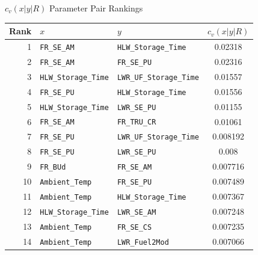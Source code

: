 \documentclass[pdf, autumn, slideColor, nocolorBG]{prosper}
\begin{document}
\begin{slide}{$c_v(x|y|R)$ Parameter Pair Rankings}
\begin{center}
\tiny
\begin{tabular}{|r|l|l|c|}
\hline
\textbf{Rank}&\textbf{$x$}&\textbf{$y$}&\textbf{$c_v(x|y|R)$}\\
\hline
1&\texttt{FR\_SE\_AM}&\texttt{HLW\_Storage\_Time}&0.02318\\
\hline
2&\texttt{FR\_SE\_AM}&\texttt{FR\_SE\_PU}&0.02316\\
\hline
3&\texttt{HLW\_Storage\_Time}&\texttt{LWR\_UF\_Storage\_Time}&0.01557\\
\hline
4&\texttt{FR\_SE\_PU}&\texttt{HLW\_Storage\_Time}&0.01556\\
\hline
5&\texttt{HLW\_Storage\_Time}&\texttt{LWR\_SE\_PU}&0.01155\\
\hline
6&\texttt{FR\_SE\_AM}&\texttt{FR\_TRU\_CR}&0.01061\\
\hline
7&\texttt{FR\_SE\_PU}&\texttt{LWR\_UF\_Storage\_Time}&0.008192\\
\hline
8&\texttt{FR\_SE\_PU}&\texttt{LWR\_SE\_PU}&0.008\\
\hline
9&\texttt{FR\_BUd}&\texttt{FR\_SE\_AM}&0.007716\\
\hline
10&\texttt{Ambient\_Temp}&\texttt{FR\_SE\_PU}&0.007489\\
\hline
11&\texttt{Ambient\_Temp}&\texttt{HLW\_Storage\_Time}&0.007367\\
\hline
12&\texttt{HLW\_Storage\_Time}&\texttt{LWR\_SE\_AM}&0.007248\\
\hline
13&\texttt{Ambient\_Temp}&\texttt{FR\_SE\_CS}&0.007235\\
\hline
14&\texttt{Ambient\_Temp}&\texttt{LWR\_Fuel2Mod}&0.007066\\
\hline
\end{tabular}
\end{center}
\end{slide}
\end{document}
